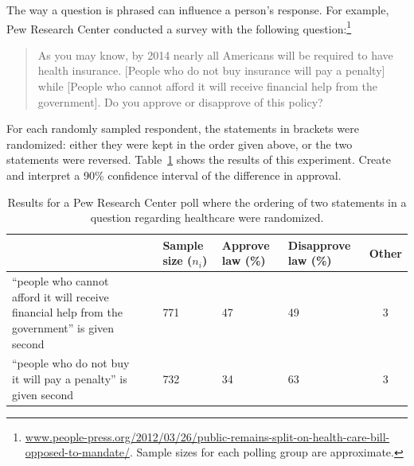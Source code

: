 \begin{example}{The way a question is phrased can influence a person's response. For example, Pew Research Center conducted a survey with the following question:\footnote{\href{http://www.people-press.org/2012/03/26/public-remains-split-on-health-care-bill-opposed-to-mandate/}{www.people-press.org/2012/03/26/public-remains-split-on-health-care-bill-opposed-to-mandate/}. Sample sizes for each polling group are approximate.}
\begin{quote}
As you may know, by 2014 nearly all Americans will be required to have health insurance. [People who do not buy insurance will pay a penalty] while [People who cannot afford it will receive financial help from the government]. Do you approve or disapprove of this policy?
\end{quote}
For each randomly sampled respondent, the statements in brackets were randomized: either they were kept in the order given above, or the two statements were reversed. Table~\ref{pewPollResultsForRandomizedStatementOrdering} shows the results of this experiment. Create and interpret a 90\% confidence interval of the difference in approval.}

\begin{table}[t]
\centering
\begin{tabular}{p{50mm}c p{13mm}p{14mm}p{16.5mm}c}
	&\ & Sample size ($n_i$) & Approve law (\%)	& Disapprove law (\%)	& Other \\
\hline
``people who cannot afford it will receive financial help from the government'' is given second \vspace{2.5mm}
	& & 771	& 47	& 49	& 3 \\
``people who do not buy it will pay a penalty'' is given second
	& & 732	& 34	& 63	& 3 \\
\hline
\end{tabular}
\caption{Results for a Pew Research Center poll where the ordering of two statements in a question regarding healthcare were randomized.}
\label{pewPollResultsForRandomizedStatementOrdering}
\end{table}


\end{example}
